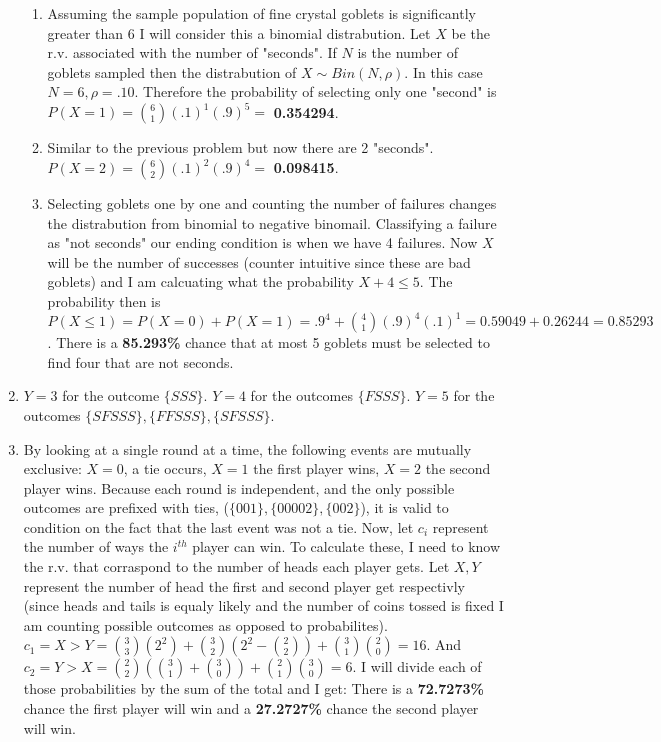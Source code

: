 \documentclass[12pt, letterpaper]{article}
\begin{document}
\begin{enumerate}
		\begin{enumerate}
			\item Assuming the sample population of fine crystal goblets is significantly greater than 6 I will consider this a binomial distrabution. Let $X$ be the r.v. associated with the number of "seconds". If $N$ is the number of goblets sampled then the distrabution of $X \sim Bin(N, \rho )$. In this case $N = 6, \rho = .10$. Therefore the probability of selecting only one "second" is $P(X = 1) = {6\choose 1}(.1)^1(.9)^5 =$ \textbf{0.354294}.
			\item Similar to the previous problem but now there are 2 "seconds". $P(X = 2) = {6\choose 2}(.1)^2(.9)^4 =$ \textbf{0.098415}.
			\item Selecting goblets one by one and counting the number of failures changes the distrabution from binomial to negative binomail. Classifying a failure as "not seconds" our ending condition is when we have 4 failures. Now $X$ will be the number of successes (counter intuitive since these are bad goblets) and I am calcuating what the probability $X + 4 \le 5$. The probability then is $P(X \le 1) = P(X = 0) + P(X = 1) = .9^4 + {4\choose 1}(.9)^4(.1)^1 = 0.59049 + 0.26244 = 0.85293$. There is a \textbf{85.293\%} chance that at most 5 goblets must be selected to find four that are not seconds.
		\end{enumerate}
	\item $Y = 3$ for the outcome $\{SSS\}$. $Y = 4$ for the outcomes $\{FSSS\}$. $Y = 5$ for the outcomes $\{SFSSS\}, \{FFSSS\}, \{SFSSS\}.$
	\item By looking at a single round at a time, the following events are mutually exclusive: $X = 0$, a tie occurs, $X = 1$ the first player wins, $X = 2$ the second player wins. Because each round is independent, and the only possible outcomes are prefixed with ties, ($\{001\}, \{00002\}, \{002\}$), it is valid to condition on the fact that the last event was not a tie. Now, let $c_i$ represent the number of ways the $i^{th}$ player can win. To calculate these, I need to know the r.v. that corraspond to the number of heads each player gets. Let $X, Y$ represent the number of head the first and second player get respectivly (since heads and tails is equaly likely and the number of coins tossed is fixed I am counting possible outcomes as opposed to probabilites). $c_1 = X > Y = {3\choose 3}(2^2) + {3\choose 2}(2^2-{2\choose 2}) + {3\choose 1}{2\choose 0} = 16$. And $c_2 = Y > X = {2\choose 2}({3\choose 1}+{3\choose 0}) + {2\choose 1}{3\choose 0} = 6$. I will divide each of those probabilities by the sum of the total and I get: There is a \textbf{72.7273\%} chance the first player will win and a \textbf{27.2727\%} chance the second player will win.
\end{enumerate}
\end{document}
